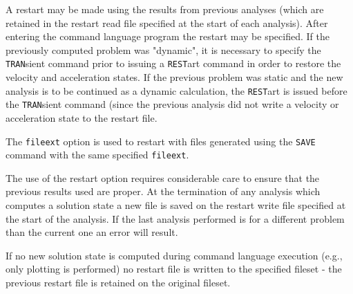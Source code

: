\headb

A restart may be made using the results from previous
analyses (which are retained in the restart read file specified
at the start of each analysis).  After entering the
command language program the restart may be specified.  If the previously
computed problem was "dynamic", it is necessary to
specify the {\tt TRAN}sient command prior to issuing a {\tt REST}art
command in order to restore the velocity and acceleration
states.  If the previous problem was static and the new
analysis is to be continued as a dynamic calculation, the
{\tt REST}art is issued before the {\tt TRAN}sient command (since the
previous analysis did not write a velocity or acceleration
state to the restart file.

The {\tt fileext} option is used to restart with files generated
using the {\tt SAVE} command with the same specified {\tt fileext}.

The use of the restart option requires considerable
care to ensure that the previous results used are proper.
At the termination of any analysis which computes a solution
state a new file is saved on the restart write file specified
at the start of the analysis.  If the last analysis
performed is for a different problem than the current one an
error will result.

If no new solution state is computed during command language execution
(e.g., only plotting is performed) no restart file is
written to the specified fileset - the previous restart file
is retained on the original fileset.
\vfill\eject
